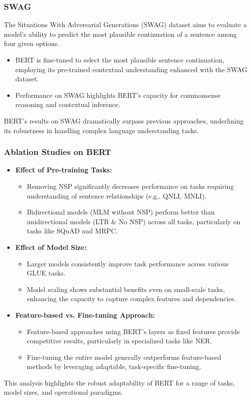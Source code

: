 \documentclass[11pt,xcolor={dvipsnames},hyperref={pdftex,pdfpagemode=UseNone,hidelinks,pdfdisplaydoctitle=true},usepdftitle=false]{beamer}
\begin{document}
\begin{frame}
\frametitle{SWAG}
The Situations With Adversarial Generations (SWAG) dataset aims to evaluate a model's ability to predict the most plausible continuation of a sentence among four given options.
\begin{itemize}
    \item BERT is fine-tuned to select the most plausible sentence continuation, employing its pre-trained contextual understanding enhanced with the SWAG dataset.
    \item Performance on SWAG highlights BERT's capacity for commonsense reasoning and contextual inference.
\end{itemize}
BERT's results on SWAG dramatically surpass previous approaches, underlining its robustness in handling complex language understanding tasks.
\end{frame}

\begin{frame}
\frametitle{Ablation Studies on BERT}
\begin{itemize}
    \item \textbf{Effect of Pre-training Tasks:}
    \begin{itemize}
        \item Removing NSP significantly decreases performance on tasks requiring understanding of sentence relationships (e.g., QNLI, MNLI).
        \item Bidirectional models (MLM without NSP) perform better than unidirectional models (LTR \& No NSP) across all tasks, particularly on tasks like SQuAD and MRPC.
    \end{itemize}
    \item \textbf{Effect of Model Size:}
    \begin{itemize}
        \item Larger models consistently improve task performance across various GLUE tasks.
        \item Model scaling shows substantial benefits even on small-scale tasks, enhancing the capacity to capture complex features and dependencies.
    \end{itemize}
    \item \textbf{Feature-based vs. Fine-tuning Approach:}
    \begin{itemize}
        \item Feature-based approaches using BERT's layers as fixed features provide competitive results, particularly in specialized tasks like NER.
        \item Fine-tuning the entire model generally outperforms feature-based methods by leveraging adaptable, task-specific fine-tuning.
    \end{itemize}
\end{itemize}
This analysis highlights the robust adaptability of BERT for a range of tasks, model sizes, and operational paradigms.
\end{frame}
    
\end{document}

